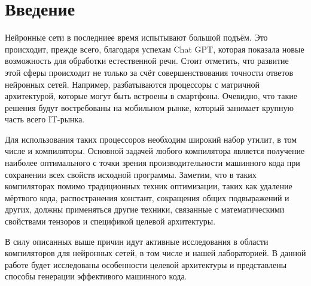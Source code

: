 \section{Введение}
\label{sec:Chapter0} 

Нейронные сети в последниее время испытывают большой подъём.
Это происходит, прежде всего, благодаря успехам Chat GPT,
которая показала новые возможность для обработки естественной речи.
Стоит отметить, что развитие этой сферы происходит не только за счёт
совершенствования точности ответов нейронных сетей. Например,
разбатываются процессоры с матричной архитектурой, которые могут
быть встроены в смартфоны. Очевидно, что такие решения будут
востребованы на мобильном рынке, который занимает крупную часть
всего IT-рынка.

Для использования таких процессоров необходим широкий набор утилит,
в том числе и компиляторы. Основной задачей любого компилятора
является получение наиболее оптимального с точки зрения
производительности машинного кода при сохранении всех свойств
исходной программы. Заметим, что в таких компиляторах помимо
традиционных техник оптимизации, таких как удаление мёртвого кода,
распостранения констант, сокращения общих подвыражений и других,
должны применяться другие техники, связанные с математическими
свойствами тензоров и спецификой целевой архитектуры.

В силу описанных выше причин идут активные исследования в
области компиляторов для нейронных сетей, в том числе и нашей
лабораторией. В данной работе будет исследованы особенности
целевой архитектуры и представлены способы генерации эффективого
машинного кода. 

\newpage
